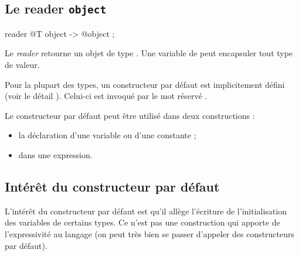 \subsection{Le reader \texttt{object}}

\begin{galgascode}
reader @T object -> @object ;
\end{galgascode}


Le \emph{reader}  retourne un objet de type . Une variable de  peut encapsuler tout type de valeur.

%
%
%
%
%
%
%
%
%












Pour la plupart des types, un constructeur par défaut est implicitement défini (voir le détail ). Celui-ci est invoqué par le mot réservé .

Le constructeur par défaut peut être utilisé dans deux constructions :
\begin{itemize}
  \item la déclaration d'une variable ou d'une constante ;
  \item dans une expression.
\end{itemize}

\subsection{Intérêt du constructeur par défaut}


L'intérêt du constructeur par défaut est qu'il allège l'écriture de l'initialisation des variables de certains types. Ce n'est pas une construction qui apporte de l'expressivité au langage (on peut très bien se passer d'appeler des constructeurs par défaut).

